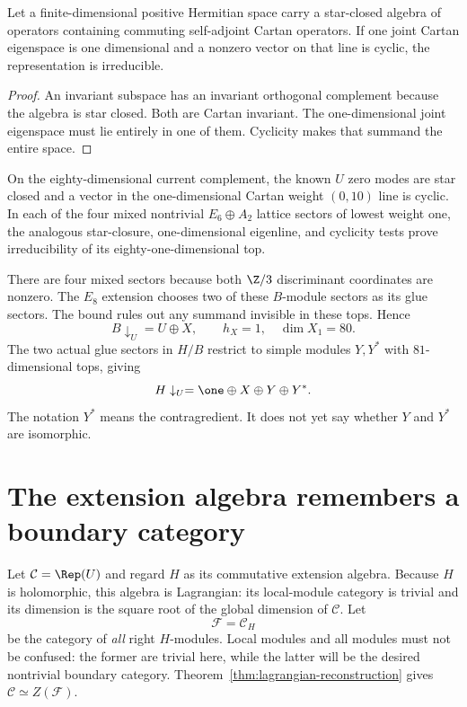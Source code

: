 \begin{lemma}
Let a finite-dimensional positive Hermitian space carry a
star-closed algebra of operators containing commuting self-adjoint
Cartan operators. If one joint Cartan eigenspace is one dimensional
and a nonzero vector on that line is cyclic, the representation is
irreducible.
\end{lemma}
\begin{proof}
An invariant subspace has an invariant orthogonal complement because
the algebra is star closed. Both are Cartan invariant. The
one-dimensional joint eigenspace must lie entirely in one of them.
Cyclicity makes that summand the entire space.
\end{proof}

\begin{constructioninput}
On the eighty-dimensional current complement, the known $U$ zero
modes are star closed and a vector in the one-dimensional Cartan
weight $(0,10)$ line is cyclic. In each of the four mixed nontrivial
$E_6\oplus A_2$ lattice sectors of lowest weight one, the analogous
star-closure, one-dimensional eigenline, and cyclicity tests prove
irreducibility of its eighty-one-dimensional top.
\end{constructioninput}

There are four mixed sectors because both $\Z/3$ discriminant
coordinates are nonzero. The $E_8$ extension chooses two of these
$B$-module sectors as its glue sectors.
The bound rules out any summand invisible in these tops. Hence
\begin{equation}\label{eq:c-B-branching}
 B\downarrow_U=U\oplus X,
 \qquad h_X=1,\quad\dim X_1=80.
\end{equation}
The two actual glue sectors in $H/B$ restrict to simple modules $Y,Y^*$
with $81$-dimensional tops, giving
\begin{equation}\label{eq:c-H-branching}
 H\downarrow_U=\one\oplus X\oplus Y\oplus Y^*.
\end{equation}
The notation $Y^*$ means the contragredient. It does not yet say
whether $Y$ and $Y^*$ are isomorphic.

\section{The extension algebra remembers a boundary category}

Let $\mathcal C=\Rep(U)$ and regard $H$ as its commutative extension
algebra. Because $H$ is holomorphic, this algebra is Lagrangian:
its local-module category is trivial and its dimension is the square
root of the global dimension of $\mathcal C$.
Let
\[
 \mathcal F=\mathcal C_H
\]
be the category of \emph{all} right $H$-modules. Local modules and
all modules must not be confused: the former are trivial here, while
the latter will be the desired nontrivial boundary category.
Theorem~\ref{thm:lagrangian-reconstruction} gives
$\mathcal C\simeq Z(\mathcal F)$.


